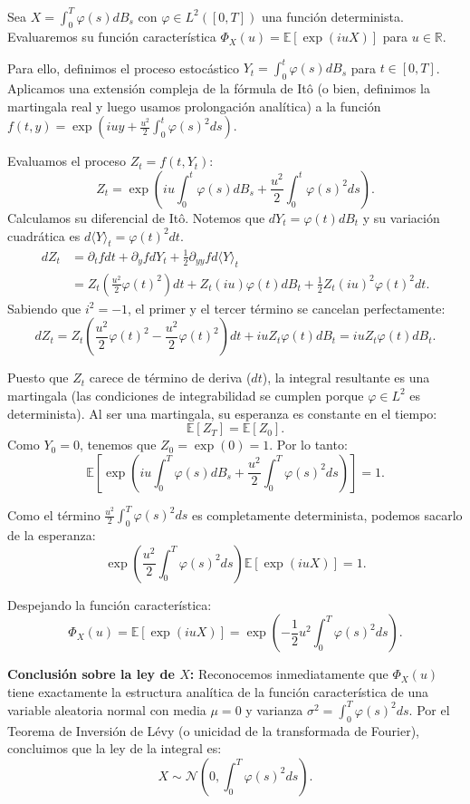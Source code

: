 \documentclass[11pt, letterpaper]{article}
\begin{document}
\begin{solucion}
    Sea $X = \int_0^T \varphi(s) dB_s$ con $\varphi \in L^2([0,T])$ una función determinista.
    Evaluaremos su función característica $\Phi_X(u) = \mathbb{E}[\exp(iuX)]$ para $u \in \mathbb{R}$.
    
    Para ello, definimos el proceso estocástico $Y_t = \int_0^t \varphi(s) dB_s$ para $t \in [0,T]$.
    Aplicamos una extensión compleja de la fórmula de Itô (o bien, definimos la martingala real y luego usamos prolongación analítica) a la función $f(t, y) = \exp\left( iu y + \frac{u^2}{2} \int_0^t \varphi(s)^2 ds \right)$.
    
    Evaluamos el proceso $Z_t = f(t, Y_t)$:
    \[ Z_t = \exp\left( iu \int_0^t \varphi(s) dB_s + \frac{u^2}{2} \int_0^t \varphi(s)^2 ds \right). \]
    Calculamos su diferencial de Itô. Notemos que $dY_t = \varphi(t) dB_t$ y su variación cuadrática es $d\langle Y \rangle_t = \varphi(t)^2 dt$.
    \begin{align*}
        dZ_t &= \partial_t f dt + \partial_y f dY_t + \frac{1}{2} \partial_{yy} f d\langle Y \rangle_t \\
        &= Z_t \left( \frac{u^2}{2} \varphi(t)^2 \right) dt + Z_t (iu) \varphi(t) dB_t + \frac{1}{2} Z_t (iu)^2 \varphi(t)^2 dt.
    \end{align*}
    Sabiendo que $i^2 = -1$, el primer y el tercer término se cancelan perfectamente:
    \[ dZ_t = Z_t \left( \frac{u^2}{2} \varphi(t)^2 - \frac{u^2}{2} \varphi(t)^2 \right) dt + iu Z_t \varphi(t) dB_t = iu Z_t \varphi(t) dB_t. \]
    
    Puesto que $Z_t$ carece de término de deriva ($dt$), la integral resultante es una martingala (las condiciones de integrabilidad se cumplen porque $\varphi \in L^2$ es determinista). 
    Al ser una martingala, su esperanza es constante en el tiempo:
    \[ \mathbb{E}[Z_T] = \mathbb{E}[Z_0]. \]
    Como $Y_0 = 0$, tenemos que $Z_0 = \exp(0) = 1$.
    Por lo tanto:
    \[ \mathbb{E}\left[ \exp\left( iu \int_0^T \varphi(s) dB_s + \frac{u^2}{2} \int_0^T \varphi(s)^2 ds \right) \right] = 1. \]
    
    Como el término $\frac{u^2}{2} \int_0^T \varphi(s)^2 ds$ es completamente determinista, podemos sacarlo de la esperanza:
    \[ \exp\left( \frac{u^2}{2} \int_0^T \varphi(s)^2 ds \right) \mathbb{E}\left[ \exp(iuX) \right] = 1. \]
    
    Despejando la función característica:
    \[ \Phi_X(u) = \mathbb{E}[\exp(iuX)] = \exp\left( -\frac{1}{2} u^2 \int_0^T \varphi(s)^2 ds \right). \]
    
    \textbf{Conclusión sobre la ley de $X$:}
    Reconocemos inmediatamente que $\Phi_X(u)$ tiene exactamente la estructura analítica de la función característica de una variable aleatoria normal con media $\mu = 0$ y varianza $\sigma^2 = \int_0^T \varphi(s)^2 ds$.
    Por el Teorema de Inversión de Lévy (o unicidad de la transformada de Fourier), concluimos que la ley de la integral es:
    \[ X \sim \mathcal{N}\left(0, \int_0^T \varphi(s)^2 ds\right). \]
\end{solucion}
\end{document}
